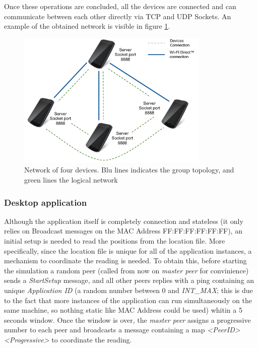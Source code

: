 Once these operations are concluded, all the devices are connected and can communicate between each other directly via TCP and UDP Sockets. An example of the obtained network is visible in figure \ref{fig:device_network}.

\begin{figure}[!htbp]
\centering
\includegraphics[width=3.6in]{imgs/Devices_network.pdf}
\caption{Network of four devices. Blu lines indicates the \direct group topology, and green lines the logical network}
\label{fig:device_network}
\end{figure}

\subsubsection{Desktop application}
Although the application itself is completely connection and stateless (it only relies on Broadcast messages on the MAC Address FF:FF:FF:FF:FF:FF), an initial setup is needed to read the positions from the location file. More specifically, since the location file is unique for all of the application instances, a mechanism to coordinate the reading is needed. To obtain this, before starting the simulation a random peer (called from now on \textit{master peer} for convinience) sends a \textit{StartSetup} message, and all other peers replies with a ping containing an unique \textit{Application ID} (a random number between 0 and \textit{INT\_MAX}; this is due to the fact that more instances of the application can run simultaneously on  the same machine, so nothing static like MAC Address could be used) whitin a 5 seconds window. Once the window is over, the \textit{master peer} assigns a progressive number to each peer and broadcasts a message containing a map \textit{\textless PeerID\textgreater\textless Progressive\textgreater} to coordinate the reading.
